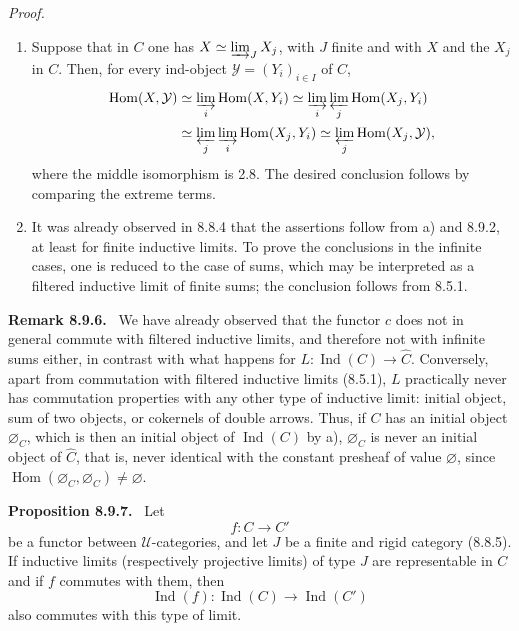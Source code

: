\documentclass[11pt]{article}
\newcommand{\U}{\mathcal{U}}
\newcommand{\Hom}{\operatorname{Hom}}
\newcommand{\Ind}{\operatorname{Ind}}
\newenvironment{statement}[1]{\par\medskip\noindent\textbf{#1.}\ }{\par\medskip}
\newenvironment{prooftext}{\par\noindent\emph{Proof.}\ }{\par\medskip}
\begin{document}
\begin{prooftext}
\begin{enumerate}[label=\alph*)]
\item Suppose that in $C$ one has $X\simeq\varinjlim_JX_j$, with $J$ finite and with $X$ and the $X_j$ in $C$. Then, for every ind-object $\mathcal Y=(Y_i)_{i\in I}$ of $C$,
\[
\begin{aligned}
\Hom(X,\mathcal Y)
&\simeq \varinjlim_i\Hom(X,Y_i)
 \simeq \varinjlim_i\varprojlim_j\Hom(X_j,Y_i)\\
&\simeq \varprojlim_j\varinjlim_i\Hom(X_j,Y_i)
 \simeq \varprojlim_j\Hom(X_j,\mathcal Y),
\end{aligned}
\]
where the middle isomorphism is 2.8. The desired conclusion follows by comparing the extreme terms.

\item It was already observed in 8.8.4 that the assertions follow from a) and 8.9.2, at least for finite inductive limits. To prove the conclusions in the infinite cases, one is reduced to the case of sums, which may be interpreted as a filtered inductive limit of finite sums; the conclusion follows from 8.5.1.
\end{enumerate}
\end{prooftext}

\begin{statement}{Remark 8.9.6}
We have already observed that the functor $c$ does not in general commute with filtered inductive limits, and therefore not with infinite sums either, in contrast with what happens for $L:\Ind(C)\to\widehat C$. Conversely, apart from commutation with filtered inductive limits (8.5.1), $L$ practically never has commutation properties with any other type of inductive limit: initial object, sum of two objects, or cokernels of double arrows. Thus, if $C$ has an initial object $\varnothing_C$, which is then an initial object of $\Ind(C)$ by a), $\varnothing_C$ is never an initial object of $\widehat C$, that is, never identical with the constant presheaf of value $\varnothing$, since $\Hom(\varnothing_C,\varnothing_C)\neq\varnothing$.
\end{statement}

\begin{statement}{Proposition 8.9.7}
Let
\[
 f:C\longrightarrow C'
\]
be a functor between $\U$-categories, and let $J$ be a finite and rigid category (8.8.5). If inductive limits (respectively projective limits) of type $J$ are representable in $C$ and if $f$ commutes with them, then
\[
 \Ind(f):\Ind(C)\longrightarrow\Ind(C')
\]
also commutes with this type of limit.
\end{statement}
\end{document}
